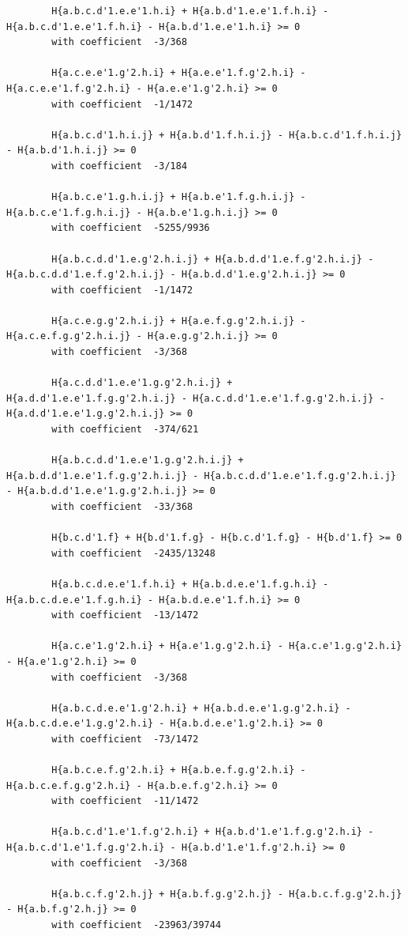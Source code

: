 \documentclass[11pt, a4paper]{kybernetika}
\begin{document}
\begin{verbatim}
		H{a.b.c.d'1.e.e'1.h.i} + H{a.b.d'1.e.e'1.f.h.i} - H{a.b.c.d'1.e.e'1.f.h.i} - H{a.b.d'1.e.e'1.h.i} >= 0
		with coefficient  -3/368
		
		H{a.c.e.e'1.g'2.h.i} + H{a.e.e'1.f.g'2.h.i} - H{a.c.e.e'1.f.g'2.h.i} - H{a.e.e'1.g'2.h.i} >= 0
		with coefficient  -1/1472
		
		H{a.b.c.d'1.h.i.j} + H{a.b.d'1.f.h.i.j} - H{a.b.c.d'1.f.h.i.j} - H{a.b.d'1.h.i.j} >= 0
		with coefficient  -3/184
		
		H{a.b.c.e'1.g.h.i.j} + H{a.b.e'1.f.g.h.i.j} - H{a.b.c.e'1.f.g.h.i.j} - H{a.b.e'1.g.h.i.j} >= 0
		with coefficient  -5255/9936
		
		H{a.b.c.d.d'1.e.g'2.h.i.j} + H{a.b.d.d'1.e.f.g'2.h.i.j} - H{a.b.c.d.d'1.e.f.g'2.h.i.j} - H{a.b.d.d'1.e.g'2.h.i.j} >= 0
		with coefficient  -1/1472
		
		H{a.c.e.g.g'2.h.i.j} + H{a.e.f.g.g'2.h.i.j} - H{a.c.e.f.g.g'2.h.i.j} - H{a.e.g.g'2.h.i.j} >= 0
		with coefficient  -3/368
		
		H{a.c.d.d'1.e.e'1.g.g'2.h.i.j} + H{a.d.d'1.e.e'1.f.g.g'2.h.i.j} - H{a.c.d.d'1.e.e'1.f.g.g'2.h.i.j} - H{a.d.d'1.e.e'1.g.g'2.h.i.j} >= 0
		with coefficient  -374/621
		
		H{a.b.c.d.d'1.e.e'1.g.g'2.h.i.j} + H{a.b.d.d'1.e.e'1.f.g.g'2.h.i.j} - H{a.b.c.d.d'1.e.e'1.f.g.g'2.h.i.j} - H{a.b.d.d'1.e.e'1.g.g'2.h.i.j} >= 0
		with coefficient  -33/368
		
		H{b.c.d'1.f} + H{b.d'1.f.g} - H{b.c.d'1.f.g} - H{b.d'1.f} >= 0
		with coefficient  -2435/13248
		
		H{a.b.c.d.e.e'1.f.h.i} + H{a.b.d.e.e'1.f.g.h.i} - H{a.b.c.d.e.e'1.f.g.h.i} - H{a.b.d.e.e'1.f.h.i} >= 0
		with coefficient  -13/1472
		
		H{a.c.e'1.g'2.h.i} + H{a.e'1.g.g'2.h.i} - H{a.c.e'1.g.g'2.h.i} - H{a.e'1.g'2.h.i} >= 0
		with coefficient  -3/368
		
		H{a.b.c.d.e.e'1.g'2.h.i} + H{a.b.d.e.e'1.g.g'2.h.i} - H{a.b.c.d.e.e'1.g.g'2.h.i} - H{a.b.d.e.e'1.g'2.h.i} >= 0
		with coefficient  -73/1472
		
		H{a.b.c.e.f.g'2.h.i} + H{a.b.e.f.g.g'2.h.i} - H{a.b.c.e.f.g.g'2.h.i} - H{a.b.e.f.g'2.h.i} >= 0
		with coefficient  -11/1472
		
		H{a.b.c.d'1.e'1.f.g'2.h.i} + H{a.b.d'1.e'1.f.g.g'2.h.i} - H{a.b.c.d'1.e'1.f.g.g'2.h.i} - H{a.b.d'1.e'1.f.g'2.h.i} >= 0
		with coefficient  -3/368
		
		H{a.b.c.f.g'2.h.j} + H{a.b.f.g.g'2.h.j} - H{a.b.c.f.g.g'2.h.j} - H{a.b.f.g'2.h.j} >= 0
		with coefficient  -23963/39744
		

\end{verbatim}
\end{document}
